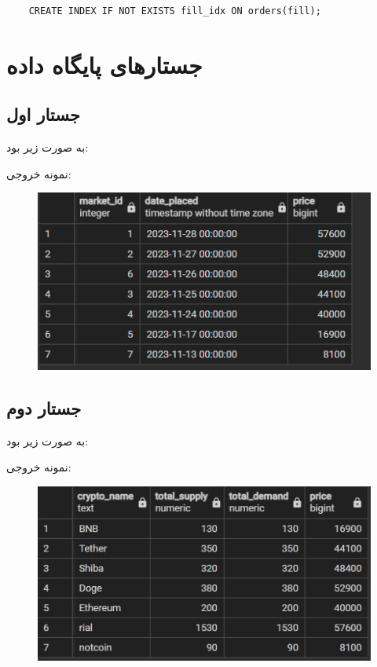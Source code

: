 \documentclass{book}
\begin{document}
\begin{latin}
    \begin{verbatim}
    CREATE INDEX IF NOT EXISTS fill_idx ON orders(fill);
    \end{verbatim}
\end{latin}

\section{جستارهای پایگاه داده}

\subsection{جستار اول}

به صورت زیر بود:

\begin{latin}

\end{latin}
نمونه خروجی:

\begin{figure}[h]
    \centering
    \includegraphics[width=\linewidth]{sql-res/1.png}
\end{figure}

\subsection{جستار دوم}

به صورت زیر بود:

\begin{latin}
    \footnotesize

\end{latin}

نمونه خروجی:

\begin{figure}[h]
    \centering
    \includegraphics[width=0.6\linewidth]{sql-res/2.jpg}
\end{figure}
\newpage
\end{document}
